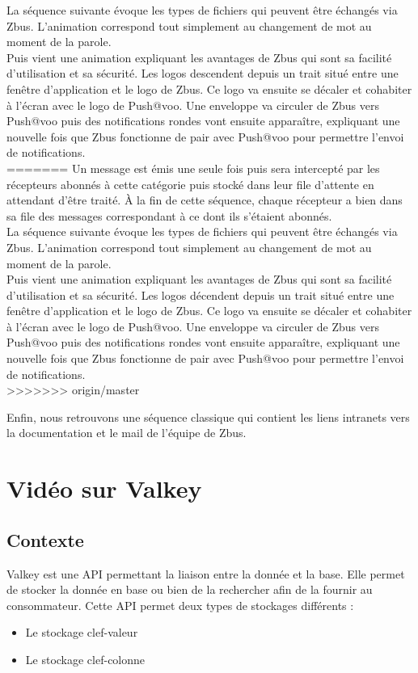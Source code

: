 La séquence suivante évoque les types de fichiers qui peuvent être échangés via Zbus. L'animation correspond tout simplement au changement de mot au moment de la parole.\\

Puis vient une animation expliquant les avantages de Zbus qui sont sa facilité d'utilisation et sa sécurité. Les logos descendent depuis un trait situé entre une fenêtre d'application et le logo de Zbus. Ce logo va ensuite se décaler et cohabiter à l'écran avec le logo de Push@voo. Une enveloppe va circuler de Zbus vers Push@voo puis des notifications rondes vont ensuite apparaître, expliquant une nouvelle fois que Zbus fonctionne de pair avec Push@voo pour permettre l'envoi de notifications.\\
=======
Un message est émis une seule fois puis sera intercepté par les récepteurs abonnés à cette catégorie puis stocké dans leur file d'attente en attendant d'être traité. À la fin de cette séquence, chaque récepteur a bien dans sa file des messages correspondant à ce dont ils s'étaient abonnés.\\

La séquence suivante évoque les types de fichiers qui peuvent être échangés via Zbus. L'animation correspond tout simplement au changement de mot au moment de la parole.\\

Puis vient une animation expliquant les avantages de Zbus qui sont sa facilité d'utilisation et sa sécurité. Les logos décendent depuis un trait situé entre une fenêtre d'application et le logo de Zbus. Ce logo va ensuite se décaler et cohabiter à l'écran avec le logo de Push@voo. Une enveloppe va circuler de Zbus vers Push@voo puis des notifications rondes vont ensuite apparaître, expliquant une nouvelle fois que Zbus fonctionne de pair avec Push@voo pour permettre l'envoi de notifications.\\
>>>>>>> origin/master

Enfin, nous retrouvons une séquence classique qui contient les liens intranets vers la documentation et le mail de l'équipe de Zbus.


\section{Vidéo sur Valkey}

\subsection{Contexte}
Valkey est une API permettant la liaison entre la donnée et la base. Elle permet de stocker la donnée en base ou bien de la rechercher afin de la fournir au consommateur. Cette API permet deux types de stockages différents :\\
\begin{itemize}
\item Le stockage clef-valeur
\item Le stockage clef-colonne\\
\end{itemize}

